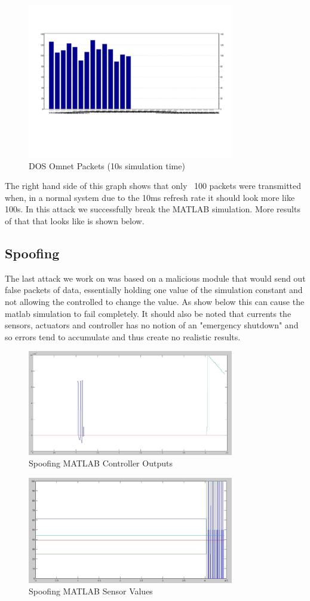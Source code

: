 \begin{figure}[ht!]
        \centering
		\includegraphics[width=90mm]{figs/DOS_Omnet.png}
        \caption{DOS Omnet Packets (10s simulation time)}
        \label{fig:DOSOmnetThroughput}        
\end{figure}

The right hand side of this graph shows that only ~100 packets were transmitted when, in a normal system due to the 10ms refresh rate it should look more like 100s. In this attack we successfully break the MATLAB simulation. More results of that that looks like is shown below. 

\subsection{Spoofing}

The last attack we work on was based on a malicious module that would send out false packets of data, essentially holding one value of the simulation constant and not allowing the controlled to change the value. As show below this can cause the matlab simulation to fail completely. It should also be noted that currents the sensors, actuators and controller has no notion of an "emergency shutdown" and so errors tend to accumulate and thus create no realistic results. 

\begin{figure}[ht!]
        \centering
		\includegraphics[width=90mm]{figs/broken_outputs.jpeg}
        \caption{Spoofing MATLAB Controller Outputs}
        \label{fig:SpoofingAttackActuators}        
\end{figure}

\begin{figure}[ht!]
        \centering
		\includegraphics[width=90mm]{figs/broken_inputs.jpeg}
        \caption{Spoofing MATLAB Sensor Values}
        \label{fig:SpoofingAttackSensors}        
\end{figure}



